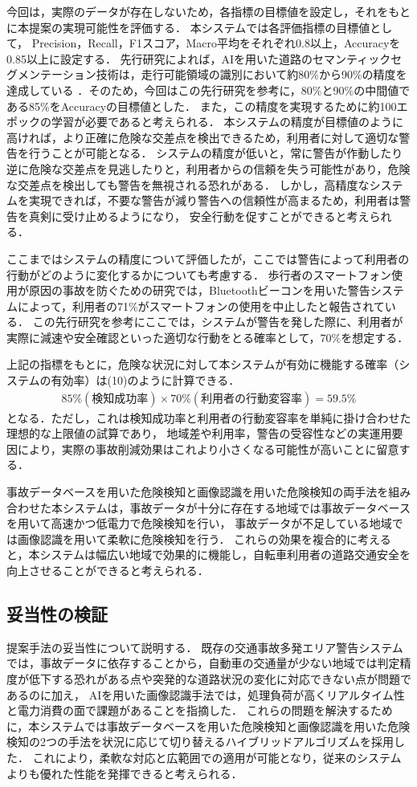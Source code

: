 \documentclass[uplatex,dvipdfmx]{jsarticle}
\begin{document}
今回は，実際のデータが存在しないため，各指標の目標値を設定し，それをもとに本提案の実現可能性を評価する．
本システムでは各評価指標の目標値として，
Precision，Recall，F1スコア，Macro平均をそれぞれ0.8以上，Accuracyを0.85以上に設定する．
先行研究によれば，AIを用いた道路のセマンティックセグメンテーション技術は，走行可能領域の識別において約80\%から90\%の精度を達成している
\cite{ref:road_segmentation}．そのため，今回はこの先行研究を参考に，80\%と90\%の中間値である85\%をAccuracyの目標値とした．
また，この精度を実現するために約100エポックの学習が必要であると考えられる．
本システムの精度が目標値のように高ければ，より正確に危険な交差点を検出できるため，利用者に対して適切な警告を行うことが可能となる．
システムの精度が低いと，常に警告が作動したり逆に危険な交差点を見逃したりと，利用者からの信頼を失う可能性があり，危険な交差点を検出しても警告を無視される恐れがある．
しかし，高精度なシステムを実現できれば，不要な警告が減り警告への信頼性が高まるため，利用者は警告を真剣に受け止めるようになり，
安全行動を促すことができると考えられる．

ここまではシステムの精度について評価したが，ここでは警告によって利用者の行動がどのように変化するかについても考慮する．
歩行者のスマートフォン使用が原因の事故を防ぐための研究では，Bluetoothビーコンを用いた警告システムによって，利用者の71\%がスマートフォンの使用を中止したと報告されている\cite{ref:user_alert}．
この先行研究を参考にここでは，システムが警告を発した際に、利用者が実際に減速や安全確認といった適切な行動をとる確率として，70\%を想定する．

上記の指標をもとに，危険な状況に対して本システムが有効に機能する確率（システムの有効率）は(10)のように計算できる．
\begin{align}
85\% (検知成功率) × 70\% (利用者の行動変容率) = 59.5\%
\end{align}
となる．ただし，これは検知成功率と利用者の行動変容率を単純に掛け合わせた理想的な上限値の試算であり，
地域差や利用率，警告の受容性などの実運用要因により，実際の事故削減効果はこれより小さくなる可能性が高いことに留意する．

事故データベースを用いた危険検知と画像認識を用いた危険検知の両手法を組み合わせた本システムは，事故データが十分に存在する地域では事故データベースを用いて高速かつ低電力で危険検知を行い，
事故データが不足している地域では画像認識を用いて柔軟に危険検知を行う．
これらの効果を複合的に考えると，本システムは幅広い地域で効果的に機能し，自転車利用者の道路交通安全を向上させることができると考えられる．

\subsection{妥当性の検証}
提案手法の妥当性について説明する．
既存の交通事故多発エリア警告システムでは，事故データに依存することから，自動車の交通量が少ない地域では判定精度が低下する恐れがある点や突発的な道路状況の変化に対応できない点が問題であるのに加え，
AIを用いた画像認識手法では，処理負荷が高くリアルタイム性と電力消費の面で課題があることを指摘した．
これらの問題を解決するために，本システムでは事故データベースを用いた危険検知と画像認識を用いた危険検知の2つの手法を状況に応じて切り替えるハイブリッドアルゴリズムを採用した．
これにより，柔軟な対応と広範囲での適用が可能となり，従来のシステムよりも優れた性能を発揮できると考えられる．
\end{document}
